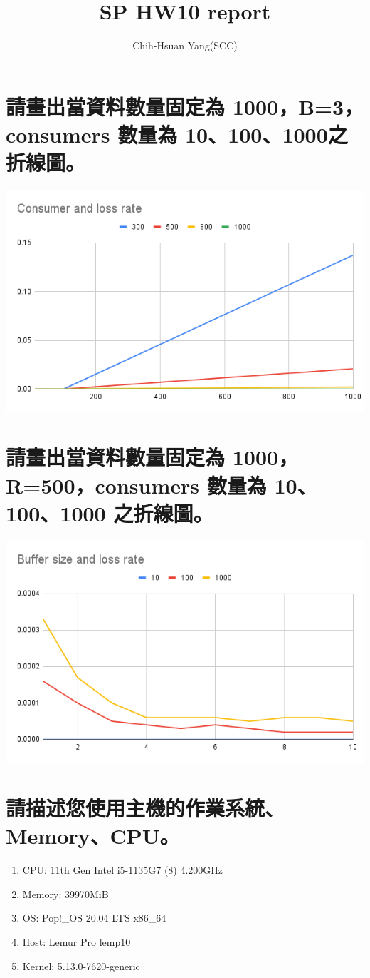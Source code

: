 \documentclass[a4paper, 12pt]{article}
\title{SP HW10 report}
\author{Chih-Hsuan Yang(SCC)}
\begin{document}
\begin{CJK*}{UTF8}{bsmi}
  \maketitle
  \newpage

  \section{請畫出當資料數量固定為 1000，B=3，consumers 數量為 10、100、1000之折線圖。}
  \includegraphics[width=\textwidth]{images/Consumer and loss rate.png}
  \label{fig1}

  \section{請畫出當資料數量固定為 1000，R=500，consumers 數量為 10、100、1000 之折線圖。}
  \includegraphics[width=\textwidth]{images/Buffer size and loss rate.png}

  \section{請描述您使用主機的作業系統、Memory、CPU。}
  \begin{enumerate}
    \item CPU: 11th Gen Intel i5-1135G7 (8) \@ 4.200GHz
    \item Memory: 39970MiB
    \item OS: Pop!\_OS 20.04 LTS x86\_64
    \item Host: Lemur Pro lemp10
    \item Kernel: 5.13.0-7620-generic
  \end{enumerate}


\end{CJK*}
\end{document}
